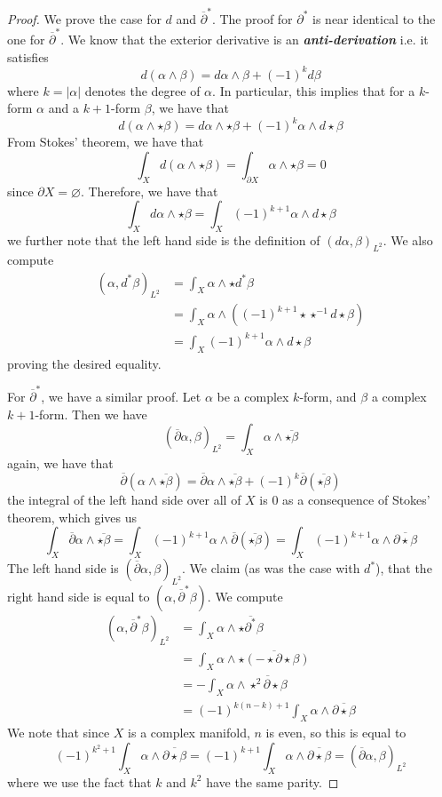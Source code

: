 \documentclass[psamsfonts, 12pt]{amsart}
\theoremstyle{definition}
\theoremstyle{remark}
\renewcommand{\emptyset}{\varnothing}
\newcommand{\ib}[1]{\textbf{\textit{#1}}}
\newcommand{\dbar}{\overline{\partial}}
\newcommand{\inv}{^{-1}}
\begin{document}
\begin{proof}
We prove the case for $d$ and $\dbar^*$. The proof for $\partial^*$ is near identical
to the one for $\dbar^*$. We know that the exterior derivative is an \ib{anti-derivation}
i.e. it satisfies
\[
d(\alpha \wedge \beta) = d\alpha \wedge \beta + (-1)^{k}d\beta
\]
where $k = |\alpha|$ denotes the degree of $\alpha$. In particular, this implies that
for a $k$-form $\alpha$ and a $k+1$-form $\beta$, we have that
\[
d(\alpha\wedge\star\beta) = d\alpha\wedge\star\beta + (-1)^k\alpha\wedge d\star\beta
\]
From Stokes' theorem, we have that
\[
\int_X d(\alpha\wedge\star\beta) = \int_{\partial X} \alpha\wedge\star\beta = 0
\]
since $\partial X = \emptyset$. Therefore, we have that
\[
\int_X d\alpha\wedge\star\beta = \int_X (-1)^{k+1}\alpha\wedge d\star\beta
\]
we further note that the left hand side is the definition of $(d\alpha,\beta)_{L^2}$.
We also compute
\begin{align*}
(\alpha,d^*\beta)_{L^2} &= \int_X \alpha\wedge\star d^*\beta \\
&= \int_X \alpha\wedge((-1)^{k+1}\star\star\inv d\star\beta) \\
&= \int_X (-1)^{k+1}\alpha\wedge d\star\beta
\end{align*}
proving the desired equality.

For $\dbar^*$, we have a similar proof. Let $\alpha$ be a complex $k$-form, and
$\beta$ a complex $k+1$-form. Then we have
\[
(\dbar\alpha,\beta)_{L^2} = \int_X\alpha\wedge\overline{\star\beta}
\]
again, we have that
\[
\dbar(\alpha\wedge\overline{\star\beta}) = \dbar\alpha\wedge\overline{\star\beta}
+ (-1)^k\dbar(\overline{\star\beta})
\]
the integral of the left hand side over all of $X$ is $0$ as a consequence of Stokes'
theorem, which gives us
\[
\int_X \dbar\alpha\wedge\overline{\star\beta} =
\int_X(-1)^{k+1}\alpha\wedge\dbar(\overline{\star\beta}) =
\int_X(-1)^{k+1}\alpha\wedge\overline{\partial\star\beta}
\]
The left hand side is $(\dbar\alpha,\beta)_{L^2}$. We claim (as was the case with
$d^*$), that the right hand side is equal to $(\alpha,\dbar^*\beta)$. We compute
\begin{align*}
(\alpha,\dbar^*\beta)_{L^2} &= \int_X \alpha \wedge \overline{\star\partial^*\beta} \\
&= \int_X\alpha \wedge \overline{\star(-\star\partial\star\beta)} \\
&= -\int_X\alpha\wedge\overline{\star^2\partial\star\beta} \\
&= (-1)^{k(n-k)+1}\int_X\alpha\wedge\overline{\partial\star\beta}
\end{align*}
We note that since $X$ is a complex manifold, $n$ is even, so this is equal to
\[
(-1)^{k^2+1}\int_X\alpha\wedge\overline{\partial\star\beta}
= (-1)^{k+1}\int_X\alpha\wedge\overline{\partial\star\beta} = (\dbar\alpha,\beta)_{L^2}
\]
where we use the fact that $k$ and $k^2$ have the same parity.
\end{proof}
\end{document}
